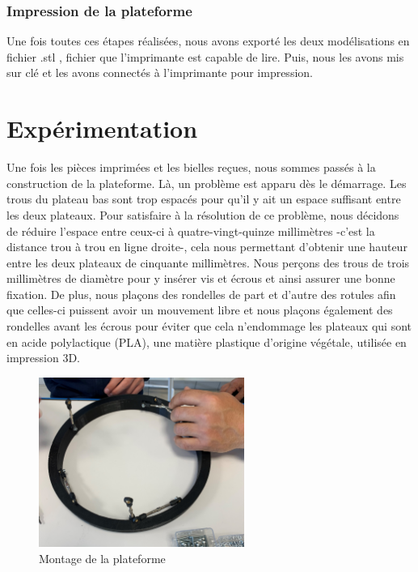 \documentclass[a4paper,12pt]{article}
\begin{document}
\subsubsection{Impression de la plateforme}

Une fois toutes ces étapes réalisées, nous avons exporté les deux modélisations en fichier \og .stl \fg, fichier que l’imprimante est capable de lire. 
Puis, nous les avons mis sur clé et les avons connectés à l’imprimante pour impression.



\newpage

\section{Expérimentation}

Une fois les pièces imprimées et les bielles reçues, nous sommes passés à la construction de la plateforme. 
Là, un problème est apparu dès le démarrage. 
Les trous du plateau bas sont trop espacés pour qu'il y ait un espace suffisant entre les deux plateaux. 
Pour satisfaire à la résolution de ce problème, nous décidons de réduire l'espace entre ceux-ci à quatre-vingt-quinze millimètres -c'est la distance trou à trou en ligne droite-, cela nous permettant d'obtenir une hauteur entre les deux plateaux de cinquante millimètres. 
Nous perçons des trous de trois millimètres de diamètre pour y insérer vis et écrous et ainsi assurer une bonne fixation. De plus, nous plaçons des rondelles de part et d'autre des rotules afin que celles-ci puissent avoir un mouvement libre et nous plaçons également des rondelles avant les écrous pour éviter que cela n’endommage les plateaux qui sont en acide polylactique (PLA), une matière plastique d’origine végétale, utilisée en impression 3D. 

\begin{figure}[H]
  \centering
  \includegraphics[width=0.6\textwidth]{montage plateforme.jpg}
  \caption{Montage de la plateforme}
\end{figure}
\end{document}
